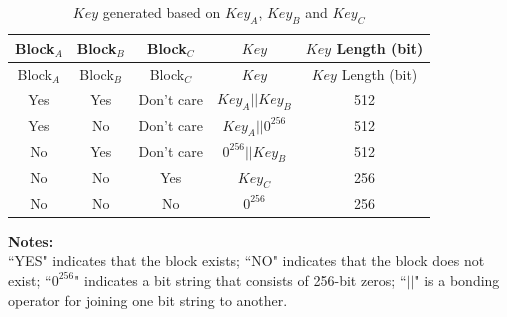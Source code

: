 \begin{longtable}[c]{ |c|c|c|c|c| }
\caption{ \begin{math}Key\end{math} generated based on \begin{math}Key_{A}\end{math}, \begin{math}Key_{B}\end{math} and \begin{math}Key_{C}\end{math}}
\label{tab:extmemencr-key-possibility}
\\\hline 
\rowcolor{lightgray}
Block$_A$ & Block$_B$ & Block$_C$ & \begin{math}Key\end{math}  & \begin{math}Key\end{math} Length (bit) \\\hline
\endfirsthead
\hline
\rowcolor{lightgray}
Block$_A$ & Block$_B$ & Block$_C$ & \begin{math}Key\end{math}  & \begin{math}Key\end{math} Length (bit) \\\hline
\endhead
\endfoot
Yes &   Yes   &  Don't care    &   \begin{math}Key_{A} || Key_{B}\end{math}    &   512   \\\hline
Yes &   No    &  Don't care    &   \begin{math}Key_{A} || 0^{256}\end{math}    &   512   \\\hline
No  &   Yes   &  Don't care    &   \begin{math}0^{256} || Key_{B}\end{math}    &   512   \\\hline
No  &   No    &  Yes       &   \begin{math}           Key_{C}\end{math}    &   256   \\\hline
No  &   No    &  No        &   \begin{math}           0^{256}\end{math}    &   256   \\\hline
\end{longtable}
\vspace{-1.5em}
{\bfseries Notes: }\\
``YES" indicates that the block exists; ``NO" indicates that the block does not exist; ``\begin{math}0^{256}\end{math}" indicates a bit string that consists of 256-bit zeros; ``\begin{math}||\end{math}" is a bonding operator for joining one bit string to another.
